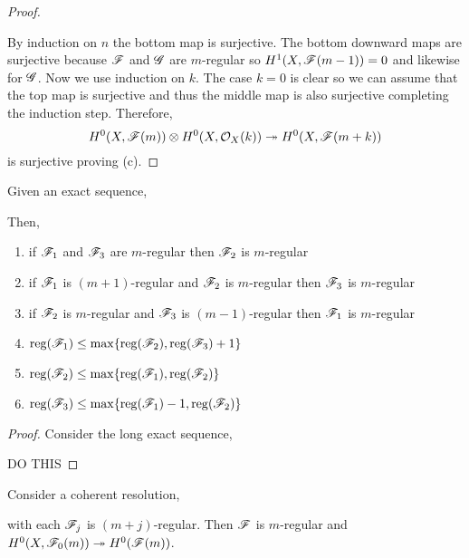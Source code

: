 \documentclass[12pt]{article}
\DeclareMathOperator{\reg}{\mathrm{reg}}
\begin{document}
\begin{proof}
\begin{center}
\end{center}
By induction on $n$ the bottom map is surjective. The bottom downward maps are surjective because $\mathscr{F}$ and $\mathscr{G}$ are $m$-regular so $H^1(X, \mathscr{F}(m-1)) = 0$ and likewise for $\mathscr{G}$. Now we use induction on $k$. The case $k = 0$ is clear so we can assume that the top map is surjective and thus the middle map is also surjective completing the induction step. Therefore, 
\[ H^0(X, \mathscr{F}(m)) \otimes H^0(X, \mathcal{O}_{X}(k)) \twoheadrightarrow H^0(X, \mathscr{F}(m+k)) \]
is surjective proving (c). 
\end{proof}

\begin{prop}
Given an exact sequence,
\begin{center}
\end{center}
Then,
\begin{enumerate}
\item if $\mathscr{F}_1$ and $\mathscr{F}_3$ are $m$-regular then $\mathscr{F}_2$ is $m$-regular
\item if $\mathscr{F}_1$ is $(m+1)$-regular and $\mathscr{F}_2$ is $m$-regular then $\mathscr{F}_3$ is $m$-regular
\item if $\mathscr{F}_2$ is $m$-regular and $\mathscr{F}_3$ is $(m-1)$-regular then $\mathscr{F}_1$ is $m$-regular
\item $\reg(\F_1) \le \max \{ \reg(\F_2), \reg(\F_3) + 1 \}$
\item $\reg(\F_2) \le \max \{ \reg(\F_1), \reg(\F_2) \}$
\item $\reg(\F_3) \le \max \{ \reg(\F_1) - 1, \reg(\F_2) \}$
\end{enumerate}
\end{prop}

\begin{proof}
Consider the long exact sequence,
\begin{center}
\end{center}
DO THIS
\end{proof}

\begin{prop}
Consider a coherent resolution,
\begin{center}
\end{center}
with each $\mathscr{F}_j$ is $(m+j)$-regular. Then $\mathscr{F}$ is $m$-regular and $H^0(X, \mathscr{F}_0(m)) \twoheadrightarrow H^0(\mathscr{F}(m))$. 
\end{prop}
\end{document}
